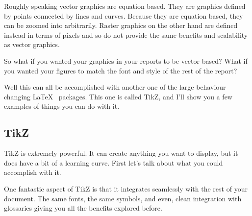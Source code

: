 \documentclass[hidelinks, float=false, crop=false]{article}
\begin{document}
        Roughly speaking vector graphics are equation based. They are graphics defined by points 
        connected by lines and curves. Because they are equation based, they can be zoomed into
        arbitrarily. Raster graphics on the other hand are defined instead in terms of pixels and 
        so do not provide the same benefits and scalability as vector graphics.

        So what if you wanted your graphics in your reports to be vector based? What if you wanted
        your figures to match the font and style of the rest of the report? 

        Well this can all be accomplished with another one of the large behaviour changing \LaTeX~
        packages. This one is called TikZ, and I'll show you a few examples of things you can do
        with it.

        \subsection{TikZ}
            TikZ is extremely powerful. It can create anything you want to display, but it does have
            a bit of a learning curve. First let's talk about what you could accomplish with it.

            One fantastic aspect of TikZ is that it integrates seamlessly with the rest of your
            document. The same fonts, the same symbols, and even, clean integration with glossaries
            giving you all the benefits explored before. 
\end{document}
